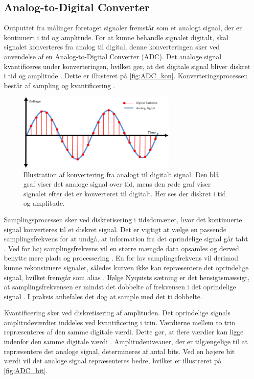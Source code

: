 \subsection{Analog-to-Digital Converter} \label{sec:ADC_teori}
Outputtet fra målinger foretaget signaler fremstår som et analogt signal, der er kontinuert i tid og amplitude. For at kunne behandle signalet digitalt, skal signalet konverteres fra analog til digital, denne konverteringen sker ved anvendelse af en Analog-to-Digital Converter (ADC). Det analoge signal kvantificeres under konverteringen, hvilket gør, at det digitale signal bliver diskret i tid og amplitude \citep{webster1998}. Dette er illusteret på \autoref{fig:ADC_kon}. Konverteringsprocessen består af sampling og kvantificering \citep{morre2003}. 

\begin{figure}[H]
\centering
\includegraphics[width=0.7\textwidth]{figures/problemloesning/adc}
\caption{Illustration af konvertering fra analogt til digitalt signal. Den blå graf viser det analoge signal over tid, mens den røde graf viser signalet efter det er konverteret til digitalt. Her ses der diskret i tid og amplitude.}
\label{fig:ADC_kon}
\end{figure}

\noindent
Samplingsprocessen sker ved diskretisering i tidsdomænet, hvor det kontinuerte signal konverteres til et diskret signal. Det er vigtigt at vælge en passende samplingsfrekvens for at undgå, at information fra det oprindelige signal går tabt \citep{morre2003}. Ved for høj samplingsfrekvens vil en større mængde data opsamles og derved benytte mere plads og processering \citep{wolf2004}. En for lav samplingsfrekvens vil derimod kunne rekonstruere signalet, således kurven ikke kan repræsentere det oprindelige signal, hvilket fremgår som alias \citep{morre2003}. Ifølge Nyquists sætning er det hensigtsmæssigt, at samplingsfrekvensen er mindst det dobbelte af frekvensen i det oprindelige signal \citep{morre2003}. I praksis anbefales det dog at sample med det ti dobbelte.

Kvantificering sker ved diskretisering af amplituden. Det oprindelige signals amplitudeværdier inddeles ved kvantificering i trin. Værdierne mellem to trin repræsenteres af den samme digitale værdi. Dette gør, at flere værdier kan ligge indenfor den samme digitale værdi \citep{morre2003}. Amplitudeniveauer, der er tilgængelige til at repræsentere det analoge signal, determineres af antal bits. Ved en højere bit værdi vil det analoge signal repræsenteres bedre, hvilket er illustreret på \autoref{fig:ADC_bit}.

